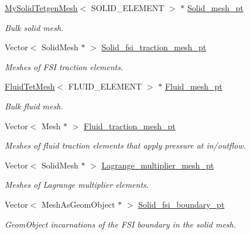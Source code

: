 \begin{DoxyCompactItemize}
\item 
\hyperlink{classMySolidTetgenMesh}{My\+Solid\+Tetgen\+Mesh}$<$ S\+O\+L\+I\+D\+\_\+\+E\+L\+E\+M\+E\+NT $>$ $\ast$ \hyperlink{classUnstructuredFSIProblem_a54debe981843ae9c7a40de65229698a3}{Solid\+\_\+mesh\+\_\+pt}
\begin{DoxyCompactList}\small\item\em Bulk solid mesh. \end{DoxyCompactList}\item 
Vector$<$ Solid\+Mesh $\ast$ $>$ \hyperlink{classUnstructuredFSIProblem_a5ff1c23ca84612c8bb468f1476e0bdd9}{Solid\+\_\+fsi\+\_\+traction\+\_\+mesh\+\_\+pt}
\begin{DoxyCompactList}\small\item\em Meshes of F\+SI traction elements. \end{DoxyCompactList}\item 
\hyperlink{classFluidTetMesh}{Fluid\+Tet\+Mesh}$<$ F\+L\+U\+I\+D\+\_\+\+E\+L\+E\+M\+E\+NT $>$ $\ast$ \hyperlink{classUnstructuredFSIProblem_a7892a7d7fd6aeff9f7a391b70bab9c81}{Fluid\+\_\+mesh\+\_\+pt}
\begin{DoxyCompactList}\small\item\em Bulk fluid mesh. \end{DoxyCompactList}\item 
Vector$<$ Mesh $\ast$ $>$ \hyperlink{classUnstructuredFSIProblem_a1ae2785eef94e3ba41fe5562a4a32c8d}{Fluid\+\_\+traction\+\_\+mesh\+\_\+pt}
\begin{DoxyCompactList}\small\item\em Meshes of fluid traction elements that apply pressure at in/outflow. \end{DoxyCompactList}\item 
Vector$<$ Solid\+Mesh $\ast$ $>$ \hyperlink{classUnstructuredFSIProblem_a2e942a90cc462bf0df04ad28057d4071}{Lagrange\+\_\+multiplier\+\_\+mesh\+\_\+pt}
\begin{DoxyCompactList}\small\item\em Meshes of Lagrange multiplier elements. \end{DoxyCompactList}\item 
Vector$<$ Mesh\+As\+Geom\+Object $\ast$ $>$ \hyperlink{classUnstructuredFSIProblem_a292fef90d668209e31d51db20d6bfd9a}{Solid\+\_\+fsi\+\_\+boundary\+\_\+pt}
\begin{DoxyCompactList}\small\item\em Geom\+Object incarnations of the F\+SI boundary in the solid mesh. \end{DoxyCompactList}\item 

\end{DoxyCompactItemize}
